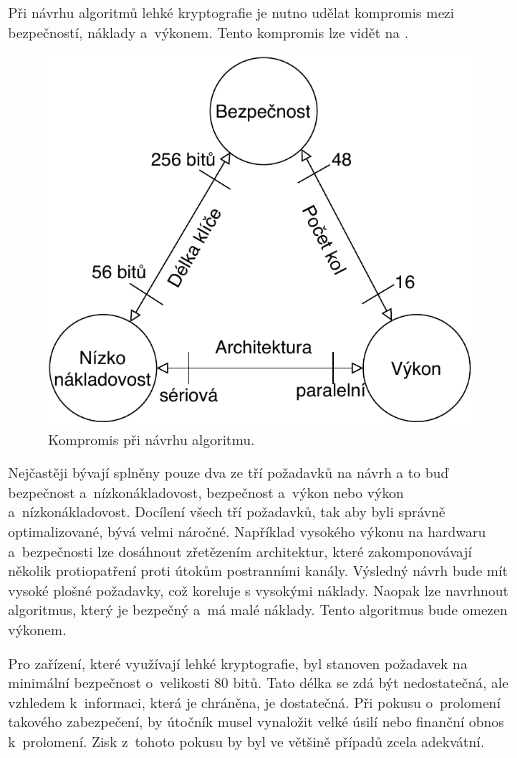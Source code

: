 Při návrhu algoritmů lehké kryptografie je nutno udělat kompromis mezi bezpečností, náklady a~výkonem. Tento kompromis lze vidět na . 
\begin{figure}[!h]
  \begin{center}
    \includegraphics[scale=0.7]{obrazky/designTradeOFF.pdf}
  \end{center}
  \caption[Kompromis při návrhu algoritmu]{Kompromis při návrhu algoritmu.\cite{PoschmannCrypto}}
  \label{img:Compromis}
\end{figure}

Nejčastěji bývají splněny pouze dva ze tří požadavků na návrh a to buď bezpečnost a~nízkonákladovost, bezpečnost a~výkon nebo výkon a~nízkonákladovost. Docílení všech tří požadavků, tak aby byli správně optimalizované, bývá velmi náročné. Například vysokého výkonu na hardwaru a~bezpečnosti lze dosáhnout zřetězením architektur, které zakomponovávají několik protiopatření proti útokům postranními kanály. Výsledný návrh bude mít vysoké plošné požadavky, což koreluje s vysokými náklady. Naopak lze navrhnout algoritmus, který je bezpečný a~má malé náklady. Tento algoritmus bude omezen výkonem.\cite{PoschmannCrypto}

Pro zařízení, které využívají lehké kryptografie, byl stanoven požadavek na minimální bezpečnost o~velikosti 80 bitů. Tato délka se zdá být nedostatečná, ale vzhledem k~informaci, která je chráněna, je dostatečná. Při pokusu o~prolomení takového zabezpečení, by útočník musel vynaložit velké úsilí nebo finanční obnos k~prolomení. Zisk z~tohoto pokusu by byl ve většině případů zcela adekvátní.\cite{Klima}

